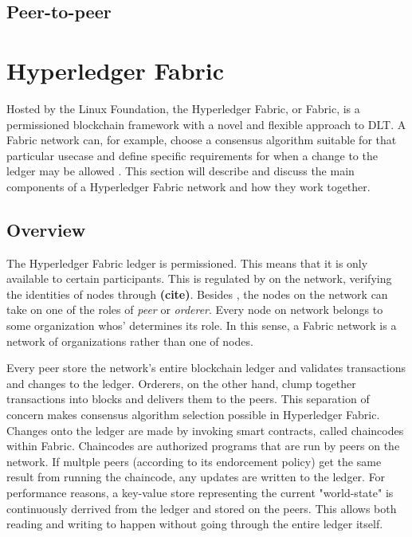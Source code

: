 \documentclass[english, biblatex, digitaloutput]{kththesis}
\begin{document}



\subsection{Peer-to-peer}






\section{Hyperledger Fabric}
\label{sec:hyperledger-fabric}

Hosted by the Linux Foundation\cite{linux-foundation_projects_nodate}, the Hyperledger Fabric, or Fabric, is a permissioned blockchain framework with a novel and flexible approach to \gls{DLT}. A Fabric network can, for example, choose a consensus algorithm suitable for that particular usecase and define specific requirements for when a change to the ledger may be allowed \cite{androulaki_hyperledger_2018}. This section will describe and discuss the main components of a Hyperledger Fabric network and how they work together.

\subsection{Overview}

The Hyperledger Fabric ledger is permissioned. This means that it is only available to certain participants. This is regulated by  on the network, verifying the identities of nodes through  \textbf{(cite)}. Besides , the nodes on the network can take on one of the roles of \textit{peer} or \textit{orderer}. Every node on network belongs to some organization whos'  determines its role. In this sense, a Fabric network is a network of organizations rather than one of nodes.

Every peer store the network's entire blockchain ledger and validates transactions and changes to the ledger. Orderers, on the other hand, clump together transactions into blocks and delivers them to the peers. This separation of concern makes consensus algorithm selection possible in Hyperledger Fabric. Changes onto the ledger are made by invoking smart contracts, called chaincodes within Fabric. Chaincodes are authorized programs that are run by peers on the network. If multple peers (according to its endorcement policy) get the same result from running the chaincode, any updates are written to the ledger. For performance reasons, a key-value store representing the current "world-state" is continuously derrived from the ledger and stored on the peers. This allows both reading and writing to happen without going through the entire ledger itself.
\end{document}
